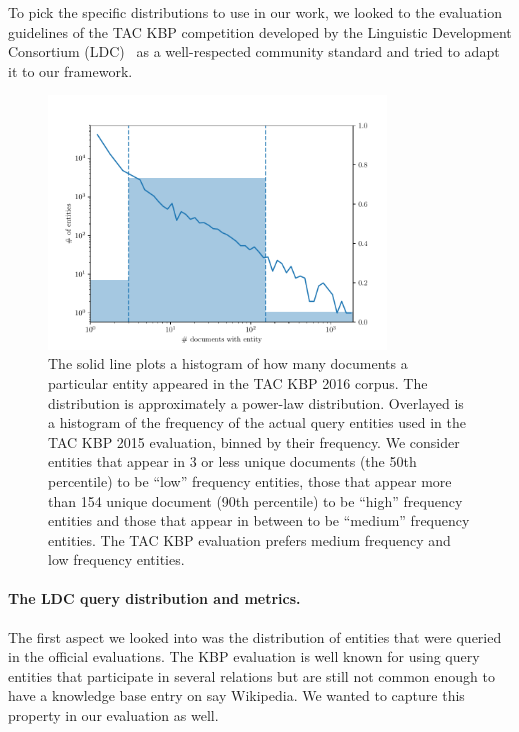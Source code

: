 To pick the specific distributions to use in our work,
we looked to the evaluation guidelines of the TAC KBP competition developed by the Linguistic Development Consortium (LDC)~\citep{ellis2015tackbp,mayfield2012evaluating} as a well-respected community standard and tried to adapt it to our framework.

\begin{figure}
  \centering
  \includegraphics[width=0.8\textwidth]{figures/analysis/distribution}
  \caption[TAC KBP 2015 Query entity distribution]{\label{fig:kbpo:distribution}
    The solid line plots a histogram of how many documents a particular entity appeared in the TAC KBP 2016 corpus.
    The distribution is approximately a power-law distribution.
    Overlayed is a histogram of the frequency of the actual query entities used in the TAC KBP 2015 evaluation, binned by their frequency. We consider entities that appear in 3 or less unique documents (the 50th percentile) to be ``low'' frequency entities, those that appear more than 154 unique document (90th percentile) to be ``high'' frequency entities and those that appear in between to be ``medium'' frequency entities.
    The TAC KBP evaluation prefers medium frequency and low frequency entities.
  }
\end{figure}

\paragraph{The LDC query distribution and metrics.}
The first aspect we looked into was the distribution of entities that were queried in the official evaluations. 
The KBP evaluation is well known for using query entities that participate in several relations but are still not common enough to have a knowledge base entry on say Wikipedia.
We wanted to capture this property in our evaluation as well.

